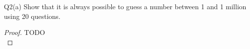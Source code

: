\begin{problem}
  {Q2(a)}
  Show that it is always possible to guess a number between 1 and 1 million using 20 questions.
  \begin{proof}
    TODO\\
  \end{proof}
\end{problem}
